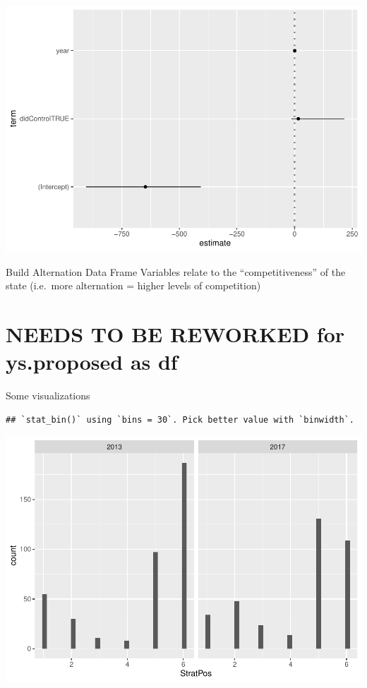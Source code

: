 \documentclass[]{article}
\newenvironment{Shaded}{\begin{snugshade}}{\end{snugshade}}
\newcommand{\KeywordTok}[1]{\textcolor[rgb]{0.13,0.29,0.53}{\textbf{#1}}}
\newcommand{\NormalTok}[1]{#1}
\newcommand{\OperatorTok}[1]{\textcolor[rgb]{0.81,0.36,0.00}{\textbf{#1}}}
\newcommand{\StringTok}[1]{\textcolor[rgb]{0.31,0.60,0.02}{#1}}
\begin{document}
\includegraphics{ProposalAnalysis_files/figure-latex/unnamed-chunk-8-3.pdf}

Build Alternation Data Frame Variables relate to the ``competitiveness''
of the state (i.e.~more alternation = higher levels of competition)

\hypertarget{needs-to-be-reworked-for-ys.proposed-as-df}{%
\section{NEEDS TO BE REWORKED for ys.proposed as
df}\label{needs-to-be-reworked-for-ys.proposed-as-df}}

Some visualizations

\begin{Shaded}
\end{Shaded}

\begin{verbatim}
## `stat_bin()` using `bins = 30`. Pick better value with `binwidth`.
\end{verbatim}

\includegraphics{ProposalAnalysis_files/figure-latex/unnamed-chunk-9-1.pdf}
\end{document}
